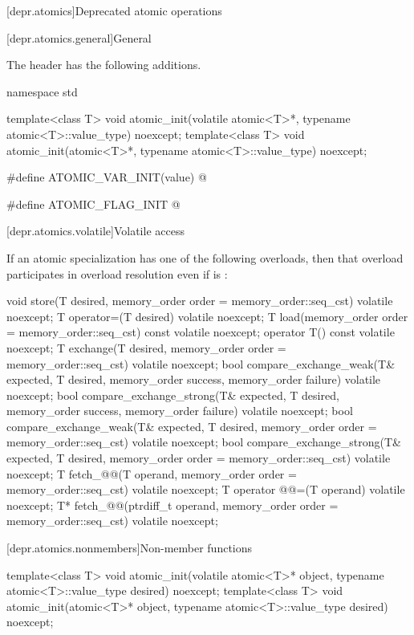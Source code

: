 [depr.atomics]{Deprecated atomic operations}

[depr.atomics.general]{General}

\pnum
The header  has the following additions.
\begin{codeblock}
namespace std {
  template<class T>
    void atomic_init(volatile atomic<T>*, typename atomic<T>::value_type) noexcept;
  template<class T>
    void atomic_init(atomic<T>*, typename atomic<T>::value_type) noexcept;

  #define ATOMIC_VAR_INIT(value) @\seebelow@

  #define ATOMIC_FLAG_INIT @\seebelow@
}
\end{codeblock}

[depr.atomics.volatile]{Volatile access}

\pnum
If an atomic specialization has one of the following overloads,
then that overload participates in overload resolution
even if  is :
\begin{codeblock}
void store(T desired, memory_order order = memory_order::seq_cst) volatile noexcept;
T operator=(T desired) volatile noexcept;
T load(memory_order order = memory_order::seq_cst) const volatile noexcept;
operator T() const volatile noexcept;
T exchange(T desired, memory_order order = memory_order::seq_cst) volatile noexcept;
bool compare_exchange_weak(T& expected, T desired,
                           memory_order success, memory_order failure) volatile noexcept;
bool compare_exchange_strong(T& expected, T desired,
                             memory_order success, memory_order failure) volatile noexcept;
bool compare_exchange_weak(T& expected, T desired,
                           memory_order order = memory_order::seq_cst) volatile noexcept;
bool compare_exchange_strong(T& expected, T desired,
                             memory_order order = memory_order::seq_cst) volatile noexcept;
T fetch_@@(T operand, memory_order order = memory_order::seq_cst) volatile noexcept;
T operator @@=(T operand) volatile noexcept;
T* fetch_@@(ptrdiff_t operand, memory_order order = memory_order::seq_cst) volatile noexcept;
\end{codeblock}

[depr.atomics.nonmembers]{Non-member functions}

%
\begin{itemdecl}
template<class T>
  void atomic_init(volatile atomic<T>* object, typename atomic<T>::value_type desired) noexcept;
template<class T>
  void atomic_init(atomic<T>* object, typename atomic<T>::value_type desired) noexcept;
\end{itemdecl}


